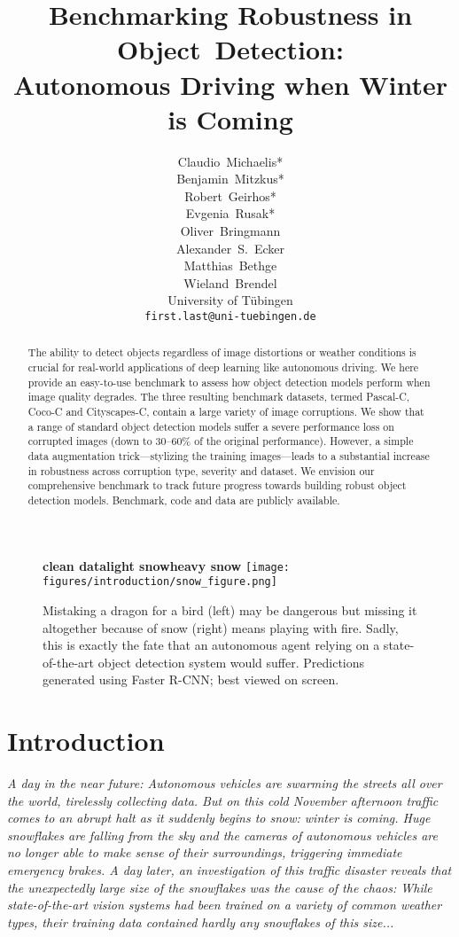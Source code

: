 \documentclass{article}
\title{Benchmarking Robustness in Object~Detection:\\Autonomous Driving when Winter is Coming}
\author{Claudio~Michaelis* \\
  \And
  Benjamin~Mitzkus* \\
  \And
  Robert~Geirhos* \\
  \And
  Evgenia~Rusak* \\
  \And
  Oliver~Bringmann\textsuperscript{} \\
  \And
  Alexander~S.~Ecker\textsuperscript{} \\
  \And
  Matthias~Bethge\textsuperscript{} \\
  \And
  Wieland~Brendel\textsuperscript{} \\
  University of T\"ubingen \\
  \texttt{first.last@uni-tuebingen.de} \\
}
\begin{document}
\maketitle

\begin{abstract}
    The ability to detect objects regardless of image distortions or weather conditions is crucial for real-world applications of deep learning like autonomous driving. We here provide an easy-to-use benchmark to assess how object detection models perform when image quality degrades. The three resulting benchmark datasets, termed Pascal-C, Coco-C and Cityscapes-C, contain a large variety of image corruptions. We show that a range of standard object detection models suffer a severe performance loss on corrupted images (down to 30--60\% of the original performance). However, a simple data augmentation trick---stylizing the training images---leads to a substantial increase in robustness across corruption type, severity and dataset. We envision our comprehensive benchmark to track future progress towards building robust object detection models. Benchmark, code and data are publicly available.
\end{abstract}




\begin{figure}[h!]
    \textbf{clean data\hspace{90pt}light snow\hspace{90pt}heavy snow}
    \centering
    \texttt{[image: figures/introduction/snow\_figure.png]}
    \caption{Mistaking a dragon for a bird (left) may be dangerous but missing it altogether because of snow (right) means playing with fire. Sadly, this is exactly the fate that an autonomous agent relying on a state-of-the-art object detection system would suffer. Predictions generated using Faster R-CNN; best viewed on screen.}
    \label{fig:teaser}
    \vspace{-0.2cm}
\end{figure}

\section{Introduction}
  \label{Introduction}
\begin{adjustwidth}{30pt}{30pt}
\textit{A day in the near future: Autonomous vehicles are swarming the streets all over the world, tirelessly collecting data. But on this cold November afternoon traffic comes to an abrupt halt as it suddenly begins to snow: winter is coming. Huge snowflakes are falling from the sky and the cameras of autonomous vehicles are no longer able to make sense of their surroundings, triggering immediate emergency brakes. A day later, an investigation of this traffic disaster reveals that the unexpectedly large size of the snowflakes was the cause of the chaos: While state-of-the-art vision systems had been trained on a variety of common weather types, their training data contained hardly any snowflakes of this size...
}\\
\end{adjustwidth}
\end{document}
